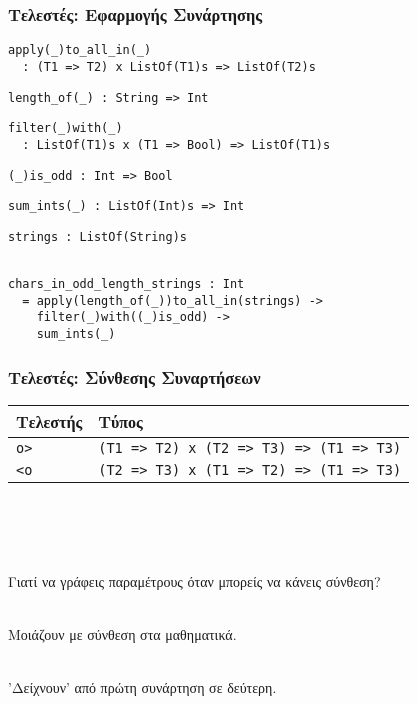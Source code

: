 \documentclass{beamer}
\def\e{\foreignlanguage{english}}
\begin{document}
\begin{frame}[fragile]

\frametitle{Τελεστές: Εφαρμογής Συνάρτησης}

\begin{otherlanguage}{english}

\begin{verbatim}
apply(_)to_all_in(_)
  : (T1 => T2) x ListOf(T1)s => ListOf(T2)s
\end{verbatim}
\begin{verbatim}
length_of(_) : String => Int
\end{verbatim}
\begin{verbatim}
filter(_)with(_)
  : ListOf(T1)s x (T1 => Bool) => ListOf(T1)s
\end{verbatim}
\begin{verbatim}
(_)is_odd : Int => Bool
\end{verbatim}
\begin{verbatim}
sum_ints(_) : ListOf(Int)s => Int
\end{verbatim}
\begin{verbatim}
strings : ListOf(String)s
\end{verbatim}
\begin{verbatim}

chars_in_odd_length_strings : Int
  = apply(length_of(_))to_all_in(strings) ->
    filter(_)with((_)is_odd) ->
    sum_ints(_)
\end{verbatim}

\end{otherlanguage}

\end{frame}

\begin{frame}

\frametitle{Τελεστές: Σύνθεσης Συναρτήσεων}

\begin{center}
\begin{tabular}{ |P{2cm}|P{8cm}| }
 \hline
 Τελεστής & Τύπος
 \\
 \hline
 \e{\texttt{o>}} & \e{\texttt{(T1 => T2) x (T2 => T3) => (T1 => T3)}}
 \\
 \e{\texttt{<o}} & \e{\texttt{(T2 => T3) x (T1 => T2) => (T1 => T3)}}
 \\
 \hline
\end{tabular}
\\~\
\\~\
\end{center}

Γιατί να γράφεις παραμέτρους όταν μπορείς να κάνεις σύνθεση?
\\~\

Μοιάζουν με σύνθεση στα μαθηματικά.
\\~\

'Δείχνουν' από πρώτη συνάρτηση σε δεύτερη.
\\~\
\end{frame}
\end{document}
